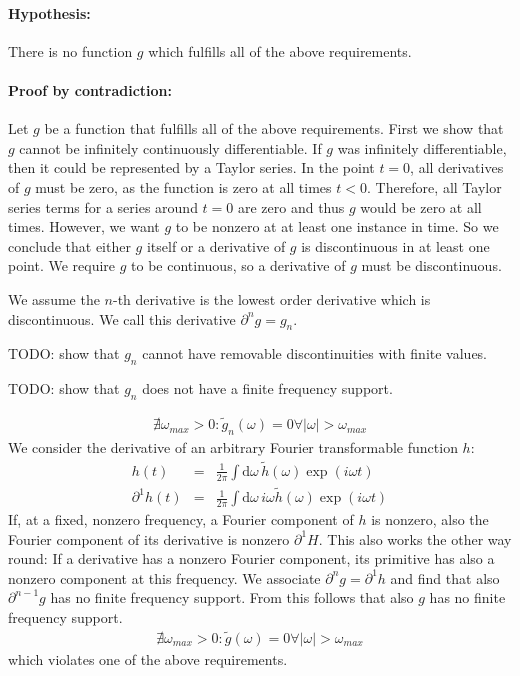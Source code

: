 \documentclass[12pt,a4paper,twoside,openright,BCOR10mm,headsepline,titlepage,abstracton,chapterprefix,final]{scrreprt}
\newcommand\totald{\textrm{d}}
\begin{document}
\paragraph{Hypothesis:} There is no function $g$ which fulfills all of the above requirements.

\paragraph{Proof by contradiction:}
Let $g$ be a function that fulfills all of the above requirements.
First we show that $g$ cannot be infinitely continuously differentiable.
If $g$ was infinitely differentiable, then it could be represented by a Taylor series.
In the point $t=0$, all derivatives of $g$ must be zero, as the function is zero at all times $t<0$.
Therefore, all Taylor series terms for a series around $t=0$ are zero 
and thus $g$ would be zero at all times.
However, we want $g$ to be nonzero at at least one instance in time.
So we conclude that either $g$ itself or a derivative of $g$ is discontinuous in at least one point.
We require $g$ to be continuous, so a derivative of $g$ must be discontinuous.

We assume the $n$-th derivative is the lowest order derivative which is discontinuous.
We call this derivative $\partial^n g = g_n$.

TODO: show that $g_n$ cannot have removable discontinuities with finite values.

TODO: show that $g_n$ does not have a finite frequency support.

\begin{eqnarray}
 \nexists \omega_{max}>0 :  \tilde{g}_n(\omega) = 0 \forall |\omega| > \omega_{max}
\end{eqnarray}
We consider the derivative of an arbitrary Fourier transformable function $h$:
\begin{eqnarray}
 h(t) &=& \frac{1}{2\pi} \int \totald\omega\, \tilde{h}(\omega) \exp(i \omega t) \\
 \partial^1 h(t) &=& \frac{1}{2\pi} \int \totald\omega\, i\omega \tilde{h}(\omega) \exp(i \omega t)
\end{eqnarray}
If, at a fixed, nonzero frequency, a Fourier component of $h$ is nonzero, also the Fourier component of its derivative is nonzero $\partial^1 H$.
This also works the other way round: If a derivative has a nonzero Fourier component, its primitive has also a nonzero component at this frequency.
We associate $\partial^n g = \partial^1 h$ and find that also $\partial^{n-1} g$ has no finite frequency support.
From this follows that also $g$ has no finite frequency support.
\begin{eqnarray}
 \nexists \omega_{max}>0 :  \tilde{g}(\omega) = 0 \forall |\omega| > \omega_{max}
\end{eqnarray}
which violates one of the above requirements.
\end{document}
